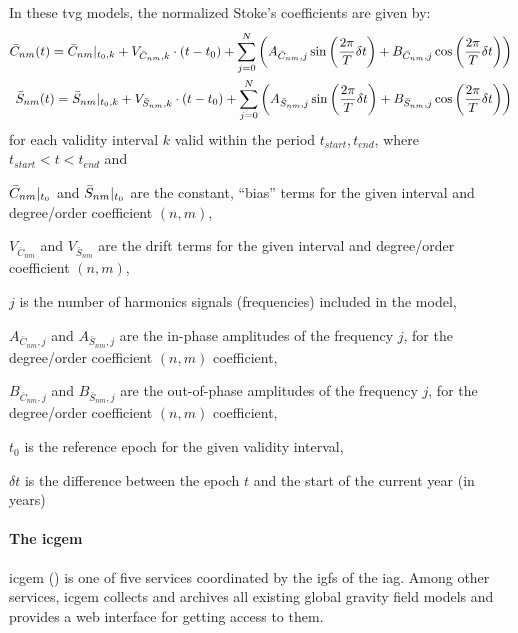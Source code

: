 In these \gls{tvg} models, the normalized Stoke's coefficients are given by:
\begin{equation}\label{eq:tvg-stokes}
  \begin{aligned}
    \bar{C}_{nm} (t) = \bar{C}_{nm}|_{t_0,k} + V_{\bar{C}_{nm},k} \cdot (t-t_0) + 
      \sum_{j=0}^{N} \left( A_{\bar{C}_{nm},j} \sin \left( \frac{2\pi}{T} \delta t \right)
      + B_{\bar{C}_{nm},j} \cos \left( \frac{2\pi}{T} \delta t \right) \right) \\
    \bar{S}_{nm} (t) = \bar{S}_{nm}|_{t_0,k} + V_{\bar{S}_{nm},k} \cdot (t-t_0) + 
      \sum_{j=0}^{N} \left( A_{\bar{S}_{nm},j} \sin \left( \frac{2\pi}{T} \delta t \right)
      + B_{\bar{S}_{nm},j} \cos \left( \frac{2\pi}{T} \delta t \right) \right)
  \end{aligned}
\end{equation}
for each validity interval $k$ valid within the period $t_{start}, t_{end}$, 
where $t_{start} < t < t_{end}$ and
\begin{description}
  \item $\bar{C}_{nm}|_{t_0}$ and $\bar{S}_{nm}|_{t_0}$ are the constant, ``bias'' 
    terms for the given interval and degree/order coefficient $(n,m)$,
  \item $V_{\bar{C}_{nm}}$ and $V_{\bar{S}_{nm}}$ are the drift terms for the 
    given interval and degree/order coefficient $(n,m)$,
  \item $j$ is the number of harmonics signals (frequencies) included in the model,
  \item $A_{\bar{C}_{nm},j}$ and $A_{\bar{S}_{nm},j}$ are the in-phase amplitudes of 
    the frequency $j$, for the degree/order coefficient $(n,m)$ coefficient,
  \item $B_{\bar{C}_{nm},j}$ and $B_{\bar{S}_{nm},j}$ are the out-of-phase amplitudes of 
    the frequency $j$, for the degree/order coefficient $(n,m)$ coefficient,
  \item $t_0$ is the reference epoch for the given validity interval,
  \item $\delta t$ is the difference between the epoch $t$ and the start of the 
    current year (in years)
\end{description}

\paragraph{The \gls{icgem}}\label{par:icgem}
\gls{icgem} (\cite{icgempub}) is one of five services coordinated by the 
\gls{igfs} of the \gls{iag}. Among other services, \gls{icgem} collects and 
archives all existing global gravity field models and provides a web interface 
for getting access to them.

